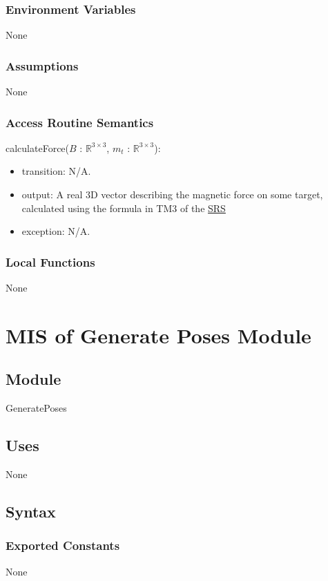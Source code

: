 \documentclass[12pt, titlepage]{article}
\begin{document}
\subsubsection{Environment Variables}
None

\subsubsection{Assumptions}
None 

\subsubsection{Access Routine Semantics}
\noindent calculateForce($B$ : $\mathbb{R}^{3 \times 3}$, $m_t$ : $\mathbb{R}^{3 \times 3}$):
\begin{itemize}
\item transition: N/A.
\item output: A real 3D vector describing the magnetic force on some target, calculated using the formula in TM3 of the \href{https://github.com/husseinsd1/optimal-em-arrangement/blob/main/docs/SRS/SRS.pdf}{SRS}
\item exception: N/A.
\end{itemize}

\subsubsection{Local Functions}
None
\newpage

\section{MIS of Generate Poses Module} \label{MISGenPoses}
\subsection{Module}
GeneratePoses

\subsection{Uses}
None

\subsection{Syntax}

\subsubsection{Exported Constants}
None
\end{document}
